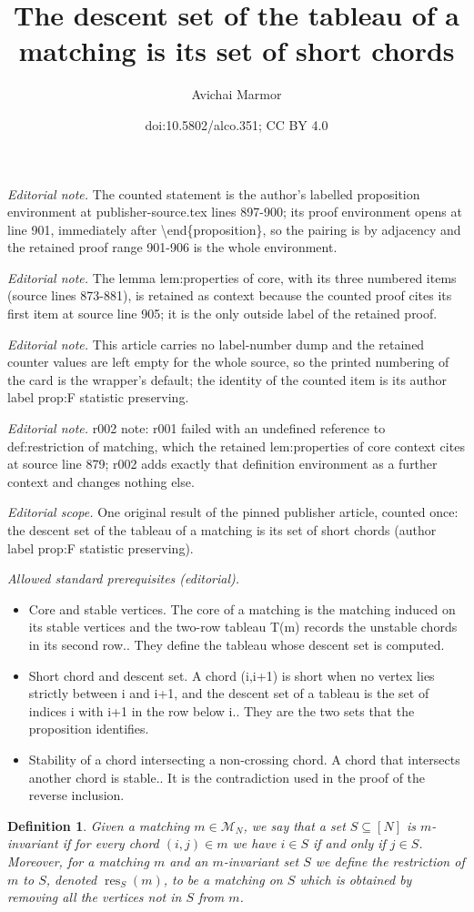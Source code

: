 \documentclass[11pt]{article}
\title{The descent set of the tableau of a matching is its set of short chords}
\author{Avichai Marmor}
\date{doi:10.5802/alco.351; CC BY 4.0}
\newtheorem{definition}[theo]{Definition}
\theoremstyle{definition}
\numberwithin{equation}{section}
\newcommand{\res}{\operatorname{res}}
\newcommand{\M}{\mathcal{M}}
\begin{document}
\maketitle
\noindent\textit{Editorial note.} The counted statement is the author's labelled proposition environment at publisher-source.tex lines 897-900; its proof environment opens at line 901, immediately after \textbackslash{}end\{proposition\}, so the pairing is by adjacency and the retained proof range 901-906 is the whole environment.\par\medskip
\noindent\textit{Editorial note.} The lemma lem:properties of core, with its three numbered items (source lines 873-881), is retained as context because the counted proof cites its first item at source line 905; it is the only outside label of the retained proof.\par\medskip
\noindent\textit{Editorial note.} This article carries no label-number dump and the retained counter values are left empty for the whole source, so the printed numbering of the card is the wrapper's default; the identity of the counted item is its author label prop:F statistic preserving.\par\medskip
\noindent\textit{Editorial note.} r002 note: r001 failed with an undefined reference to def:restriction of matching, which the retained lem:properties of core context cites at source line 879; r002 adds exactly that definition environment as a further context and changes nothing else.\par\medskip
\noindent\textit{Editorial scope.} One original result of the pinned publisher article, counted once: the descent set of the tableau of a matching is its set of short chords (author label prop:F statistic preserving).\par\medskip
\noindent\textit{Allowed standard prerequisites (editorial).}\begin{itemize}
\item Core and stable vertices. The core of a matching is the matching induced on its stable vertices and the two-row tableau T(m) records the unstable chords in its second row.. They define the tableau whose descent set is computed.
\item Short chord and descent set. A chord (i,i+1) is short when no vertex lies strictly between i and i+1, and the descent set of a tableau is the set of indices i with i+1 in the row below i.. They are the two sets that the proposition identifies.
\item Stability of a chord intersecting a non-crossing chord. A chord that intersects another chord is stable.. It is the contradiction used in the proof of the reverse inclusion.
\end{itemize}\medskip
\begin{definition}
\label{def:restriction of matching}
    Given a matching $m \in \M_N$, we say that a set $S \subseteq [N]$ is $m$-invariant if for every chord $(i,j) \in m$ we have $i \in S$ if and only if $j \in S$. Moreover, for a matching $m$ and an $m$-invariant set $S$ we define the \emph{restriction} of $m$ to $S$, denoted $\res_S(m)$, to be a matching on $S$ which is obtained by removing all the vertices not in $S$ from $m$.
\end{definition}
\end{document}
